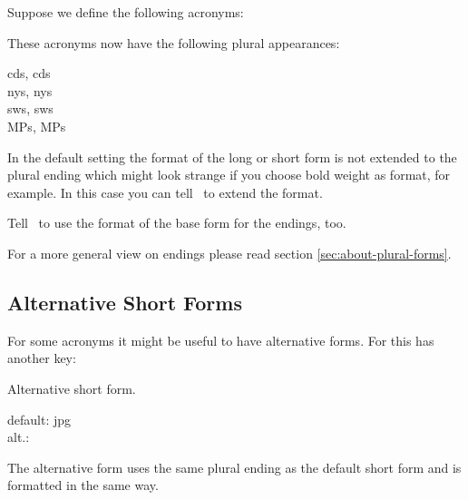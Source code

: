 \documentclass{acro-manual}
\begin{document}
Suppose we define the following acronyms:
\begin{sourcecode}
\end{sourcecode}
These acronyms now have the following plural appearances:
\begin{example}
  \acsp{cd}, \aclp{cd} \\
  \acsp{ny}, \aclp{ny} \\
  \acsp{sw}, \aclp{sw} \\
  \acsp{MP}, \aclp{MP}
\end{example}

In the default setting the format of the long or short form is not extended to
the plural ending which might look strange if you choose bold weight as
format, for example.  In this case you can tell \acro\ to extend the format.
\begin{options}
    Tell \acro\ to use the format of the base form for the
    endings, too.
\end{options}
For a more general view on endings please read section
\vref{sec:about-plural-forms}.

\subsection{Alternative Short Forms}
For some acronyms it might be useful to have alternative forms.  For this
 has another key:
\begin{properties}
    Alternative short form.
\end{properties}
\begin{example}
  default: \acs{jpg} \\
  alt.: 
\end{example}
The alternative form uses the same plural ending as the default short form and
is formatted in the same way.
\end{document}
